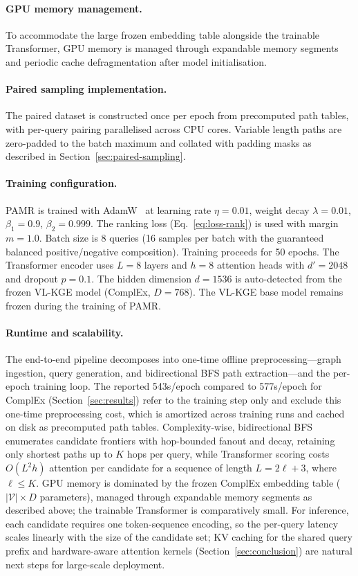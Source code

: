 \documentclass[runningheads]{llncs}
\begin{document}
\paragraph{GPU memory management.}
To accommodate the large frozen embedding table alongside the trainable
Transformer, GPU memory is managed through expandable memory segments
and periodic cache defragmentation after model initialisation.

\paragraph{Paired sampling implementation.}
The paired dataset is constructed once per epoch from precomputed
path tables, with per-query pairing parallelised across CPU cores.
Variable length paths are zero-padded to the batch maximum and
collated with padding masks as described in
Section~\ref{sec:paired-sampling}.

\paragraph{Training configuration.}
PAMR is trained with AdamW~\cite{loshchilov2019decoupled} at learning
rate $\eta = 0.01$, weight decay $\lambda = 0.01$, $\beta_1 = 0.9$,
$\beta_2 = 0.999$. The ranking loss (Eq.~\ref{eq:loss-rank}) is
used with margin $m = 1.0$. Batch size is 8 queries (16 samples per
batch with the guaranteed balanced positive/negative composition).
Training proceeds for 50 epochs. The Transformer encoder uses
$L = 8$ layers and $h = 8$ attention heads with
$d' = 2048$ and dropout $p = 0.1$. The hidden dimension
$d = 1536$ is auto-detected from the frozen VL-KGE
model (ComplEx, $D = 768$). The
VL-KGE base model remains frozen during the training of PAMR.

\paragraph{Runtime and scalability.}
The end-to-end pipeline decomposes into one-time offline
preprocessing---graph ingestion, query generation, and bidirectional BFS
path extraction---and the per-epoch training loop. The reported 543s/epoch
compared to 577s/epoch for ComplEx (Section~\ref{sec:results}) refer to the training
step only and exclude this one-time preprocessing cost, which is amortized
across training runs and cached on disk as precomputed path tables. Complexity-wise,
bidirectional BFS enumerates candidate frontiers with hop-bounded fanout
and decay, retaining only shortest paths up to $K$ hops per query, while
Transformer scoring costs $O(L^{2}h)$ attention per candidate for a
sequence of length $L = 2\ell + 3$, where $\ell \leq K$. GPU memory is
dominated by the frozen ComplEx embedding table ($|\mathcal{V}| \times D$
parameters), managed through expandable memory segments as described
above; the trainable Transformer is comparatively small. For inference,
each candidate requires one token-sequence encoding, so the per-query
latency scales linearly with the size of the candidate set; KV caching
for the shared query prefix and hardware-aware attention kernels
(Section~\ref{sec:conclusion}) are natural next steps for large-scale
deployment.
\end{document}
